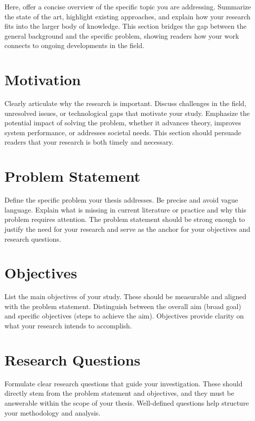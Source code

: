 Here, offer a concise overview of the specific topic you are addressing. Summarize the state of the art, highlight existing approaches, and explain how your research fits into the larger body of knowledge. This section bridges the gap between the general background and the specific problem, showing readers how your work connects to ongoing developments in the field.

\section{Motivation}
\label{sec:motivation}

Clearly articulate why the research is important. Discuss challenges in the field, unresolved issues, or technological gaps that motivate your study. Emphasize the potential impact of solving the problem, whether it advances theory, improves system performance, or addresses societal needs. This section should persuade readers that your research is both timely and necessary.

\section{Problem Statement}
\label{sec:problem-statement}

Define the specific problem your thesis addresses. Be precise and avoid vague language. Explain what is missing in current literature or practice and why this problem requires attention. The problem statement should be strong enough to justify the need for your research and serve as the anchor for your objectives and research questions.

\section{Objectives}
\label{sec:objectives}

List the main objectives of your study. These should be measurable and aligned with the problem statement. Distinguish between the overall aim (broad goal) and specific objectives (steps to achieve the aim). Objectives provide clarity on what your research intends to accomplish.

\section{Research Questions}
\label{sec:research-questions}

Formulate clear research questions that guide your investigation. These should directly stem from the problem statement and objectives, and they must be answerable within the scope of your thesis. Well-defined questions help structure your methodology and analysis.

